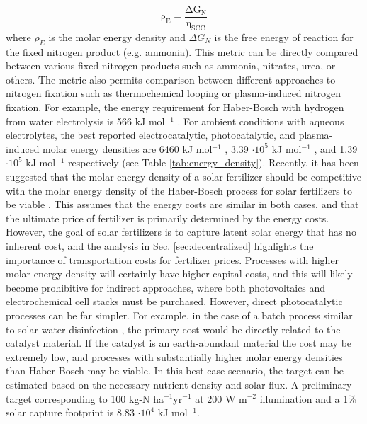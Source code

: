 \begin{equation}
\mathrm{
\rho_{E} = \frac{\Delta G_{N}}{\eta_{SCC}}
}
\label{eq:eng_dens}
\end{equation}
where $\rho_{E}$ is the molar energy density and $\Delta G_{N}$ is the free energy of reaction for the fixed nitrogen product (e.g. ammonia). This metric can be directly compared between various fixed nitrogen products such as ammonia, nitrates, urea, or others. The metric also permits comparison between different approaches to nitrogen fixation such as thermochemical looping or plasma-induced nitrogen fixation. For example, the energy requirement for Haber-Bosch with hydrogen from water electrolysis is 566 kJ mol$^{-1}$ \cite{Grundt_1982}. For ambient conditions with aqueous electrolytes, the best reported electrocatalytic, photocatalytic, and plasma-induced molar energy densities are  6460 kJ mol$^{-1}$ \cite{Song_2018}, 3.39 $\cdot 10^5$ kJ mol$^{-1}$  \cite{Shiraishi_2018}, and 1.39 $\cdot 10^5$ kJ mol$^{-1}$ \cite{Hawtof_2019} respectively (see Table \ref{tab:energy_density}). Recently, it has been suggested that the molar energy density of a solar fertilizer should be competitive with the molar energy density of the Haber-Bosch process for solar fertilizers to be viable \cite{Suryanto_2019}. This assumes that the energy costs are similar in both cases, and that the ultimate price of fertilizer is primarily determined by the energy costs. However, the goal of solar fertilizers is to capture latent solar energy that has no inherent cost, and the analysis in Sec. \ref{sec:decentralized} highlights the importance of transportation costs for fertilizer prices. Processes with higher molar energy density will certainly have higher capital costs, and this will likely become prohibitive for indirect approaches, where both photovoltaics and electrochemical cell stacks must be purchased. However, direct photocatalytic processes can be far simpler. For example, in the case of a batch process similar to solar water disinfection \cite{Lonnen_2005}, the primary cost would be directly related to the catalyst material. If the catalyst is an earth-abundant material the cost may be extremely low, and processes with substantially higher molar energy densities than Haber-Bosch may be viable. In this best-case-scenario, the target can be estimated based on the necessary nutrient density and solar flux. A preliminary target corresponding to 100 kg-N ha$^{-1}$yr$^{-1}$ at 200 W m$^{-2}$ illumination and a 1\% solar capture footprint is 8.83 $\cdot 10^4$ kJ mol$^{-1}$. 


